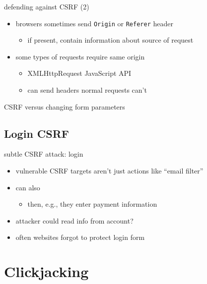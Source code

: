 \begin{frame}{defending against CSRF (2)}
    \begin{itemize}
        \item browsers sometimes send \texttt{Origin} or \texttt{Referer} header
            \begin{itemize}
            \item if present, contain information about source of request
            \end{itemize}
        \item some types of requests require same origin
            \begin{itemize}
            \item XMLHttpRequest JavaScript API
            \item can send headers normal requests can't
            \end{itemize}
    \end{itemize}
\end{frame}

\begin{frame}{CSRF versus changing form parameters}
\end{frame}


\subsection{Login CSRF}

\begin{frame}{subtle CSRF attack: login}
    \begin{itemize}
    \item vulnerable CSRF targets aren't just actions like ``email filter''
    \item can also 
        \begin{itemize}
        \item then, e.g., they enter payment information
        \end{itemize}
    \item attacker could read info from account?
    \item often websites forgot to protect login form
    \end{itemize}
\end{frame}


\section{Clickjacking}

